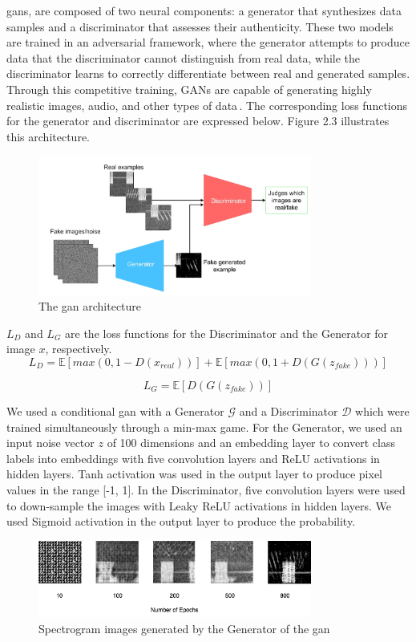 \gls{gan}s, are composed of two neural components: a generator that synthesizes data samples and a discriminator that assesses their authenticity. These two models are trained in an adversarial framework, where the generator attempts to produce data that the discriminator cannot distinguish from real data, while the discriminator learns to correctly differentiate between real and generated samples. Through this competitive training, GANs are capable of generating highly realistic images, audio, and other types of data \cite{10}. The corresponding loss functions for the generator and discriminator are expressed below. Figure 2.3 illustrates this architecture.
\begin{figure}[h]
\includegraphics[width=9cm]{figures/gan.png}
\centering
\caption{The \gls{gan} architecture  }
\centering
\end{figure} 
 $L_D$ and $L_G$ are the loss functions for the Discriminator and the Generator for image $x$, respectively.
\begin{equation}
    L_D=\mathbb{E}[max(0,1 - D(x_{real}))]+\mathbb{E}[max(0,1+D(G(z_{fake})))]
\end{equation}

\begin{equation}
    L_G=\mathbb{E}[D(G(z_{fake}))]
\end{equation}

We used a conditional \gls{gan} with a Generator $\mathcal{G}$ and a Discriminator $\mathcal{D}$ which were trained simultaneously through a min-max game. For the Generator, we used an input noise vector $z$ of 100 dimensions and an embedding layer to convert class labels into embeddings with five convolution layers and ReLU activations in hidden layers. Tanh activation was used in the output layer to produce pixel values in the range [-1, 1]. In the Discriminator, five convolution layers were used to down-sample the images with Leaky ReLU activations in hidden layers. We used Sigmoid activation in the output layer to produce the probability.
\begin{figure}[h]
\includegraphics[width=9cm]{figures/gan training.drawio (1).png}
\centering
\caption{Spectrogram images generated by the Generator of the \gls{gan}}
\centering
\end{figure}

